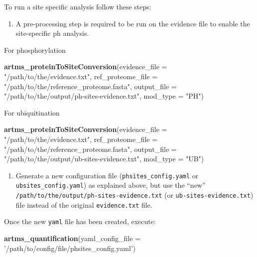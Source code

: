 \documentclass[]{article}
\newenvironment{Shaded}{\begin{snugshade}}{\end{snugshade}}
\newcommand{\KeywordTok}[1]{\textcolor[rgb]{0.13,0.29,0.53}{\textbf{#1}}}
\newcommand{\DataTypeTok}[1]{\textcolor[rgb]{0.13,0.29,0.53}{#1}}
\newcommand{\StringTok}[1]{\textcolor[rgb]{0.31,0.60,0.02}{#1}}
\newcommand{\NormalTok}[1]{#1}
\providecommand{\tightlist}{%
  \setlength{\itemsep}{0pt}\setlength{\parskip}{0pt}}
\begin{document}
To run a site specific analysis follow these steps:

\begin{enumerate}
\def\labelenumi{\arabic{enumi}.}
\tightlist
\item
  A pre-processing step is required to be run on the evidence file to
  enable the site-specific ph analysis.
\end{enumerate}

For phosphorylation

\begin{Shaded}
\begin{Highlighting}[]
\KeywordTok{artms_proteinToSiteConversion}\NormalTok{(}\DataTypeTok{evidence_file =} \StringTok{"/path/to/the/evidence.txt"}\NormalTok{, }\DataTypeTok{ref_proteome_file =} \StringTok{"/path/to/the/reference_proteome.fasta"}\NormalTok{, }\DataTypeTok{output_file =} \StringTok{"/path/to/the/output/ph-sites-evidence.txt"}\NormalTok{, }\DataTypeTok{mod_type =} \StringTok{"PH"}\NormalTok{)}
\end{Highlighting}
\end{Shaded}

For ubiquitination

\begin{Shaded}
\begin{Highlighting}[]
\KeywordTok{artms_proteinToSiteConversion}\NormalTok{(}\DataTypeTok{evidence_file =} \StringTok{"/path/to/the/evidence.txt"}\NormalTok{, }\DataTypeTok{ref_proteome_file =} \StringTok{"/path/to/the/reference_proteome.fasta"}\NormalTok{, }\DataTypeTok{output_file =} \StringTok{"/path/to/the/output/ub-sites-evidence.txt"}\NormalTok{, }\DataTypeTok{mod_type =} \StringTok{"UB"}\NormalTok{)}
\end{Highlighting}
\end{Shaded}

\begin{enumerate}
\def\labelenumi{\arabic{enumi}.}
\setcounter{enumi}{1}
\tightlist
\item
  Generate a new configuration file (\texttt{phsites\_config.yaml} or
  \texttt{ubsites\_config.yaml}) as explained above, but use the ``new''
  \texttt{/path/to/the/output/ph-sites-evidence.txt} (or
  \texttt{ub-sites-evidence.txt}) file instead of the original
  \texttt{evidence.txt} file.
\end{enumerate}

Once the new \texttt{yaml} file has been created, execute:

\begin{Shaded}
\begin{Highlighting}[]
\KeywordTok{artms_quantification}\NormalTok{(}\DataTypeTok{yaml_config_file =} \StringTok{'/path/to/config/file/phsites_config.yaml'}\NormalTok{)}
\end{Highlighting}
\end{Shaded}
\end{document}
